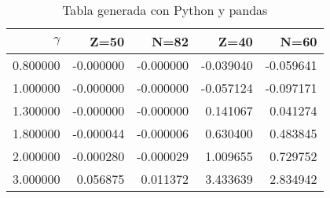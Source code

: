\begin{table}
\caption{Tabla generada con Python y pandas}
\label{tab:datos}
\begin{tabular}{rrrrr}
\toprule
$\gamma$ & Z=50 & N=82 & Z=40 & N=60 \\
\midrule
0.800000 & -0.000000 & -0.000000 & -0.039040 & -0.059641 \\
1.000000 & -0.000000 & -0.000000 & -0.057124 & -0.097171 \\
1.300000 & -0.000000 & -0.000000 & 0.141067 & 0.041274 \\
1.800000 & -0.000044 & -0.000006 & 0.630400 & 0.483845 \\
2.000000 & -0.000280 & -0.000029 & 1.009655 & 0.729752 \\
3.000000 & 0.056875 & 0.011372 & 3.433639 & 2.834942 \\
\bottomrule
\end{tabular}
\end{table}
